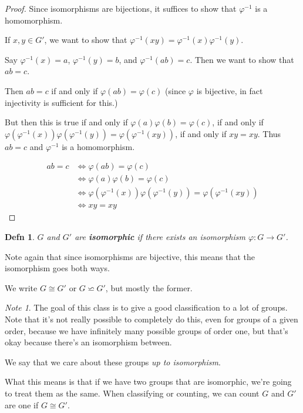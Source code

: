 \documentclass[12pt]{article}
\def\phi{\varphi}
\newtheorem{definition}{Defn}
\theoremstyle{remark}
\theoremstyle{remark}
\theoremstyle{remark}
\theoremstyle{remark}
\theoremstyle{remark}
\newtheorem*{note}{Note}
\begin{document}
\begin{proof}
  Since isomorphisms are bijections, it suffices to show that $\phi^{-1}$ is a homomorphism.

  If $x, y \in G'$, we want to show that $\phi^{-1}(xy) = \phi^{-1}(x)
    \phi^{-1}(y)$.

  Say $\phi^{-1}(x) = a$, $\phi^{-1}(y) = b$, and $\phi^{-1}(ab) = c$. Then we
  want to show that $ab  = c$.

  Then $ab = c$ if and only if $\phi(ab) = \phi(c)$ (since $\phi$ is bijective,
  in fact injectivity is sufficient for this.)

  But then this is true if and only if $\phi(a)\phi(b) = \phi(c)$, if and only if
  $\phi(\phi^{-1}(x))\phi(\phi^{-1}(y)) = \phi(\phi^{-1}(xy))$, if and only if $xy
    = xy$. Thus $ab = c$ and $\phi^{-1}$ is a homomorphism.

  \begin{align*}
    ab = c & \Leftrightarrow \phi(ab) = \phi(c)                                         \\
           & \Leftrightarrow \phi(a)\phi(b) = \phi(c)                                   \\
           & \Leftrightarrow \phi(\phi^{-1}(x))\phi(\phi^{-1}(y)) = \phi(\phi^{-1}(xy)) \\
           & \Leftrightarrow xy = xy
  \end{align*}
\end{proof}

\begin{definition}
	$G$ and $G'$ are {\bf isomorphic} if there exists an isomorphism $\phi: G \to G'$.
\end{definition}

Note again that since isomorphisms are bijective, this means that the
isomorphism goes both ways.

We write $G \cong G'$ or $G \backsimeq G'$, but mostly the former.

\begin{note}
	The goal of this class is to give a good classification to a lot of groups.
	Note that it's not really possible to completely do this, even for groups of a
	given order, because we have infinitely many possible groups of order one, but
	that's okay because there's an isomorphism between.

	We say that we care about these groups {\it up to isomorphism}.

	What this means is that if we have two groups that are isomorphic, we're going
	to treat them as the same. When classifying or counting, we can count $G$ and
	$G'$ are one if $G \cong G'$.
\end{note}
\end{document}
